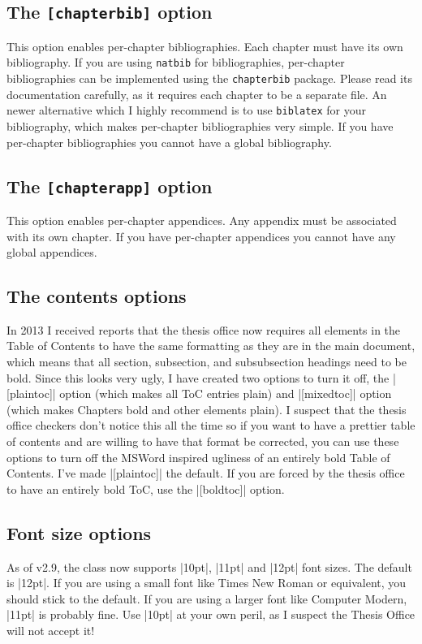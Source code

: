 \documentclass[11pt]{article}
\newcommand*{\pkg}[1]{\texttt{#1}\xspace}
\begin{document}
\subsection{The \pkg{[chapterbib]} option}
This option enables per-chapter bibliographies. Each chapter must have its own bibliography. If you are using \pkg{natbib} for bibliographies, per-chapter bibliographies can be implemented using the \pkg{chapterbib} package. Please read its documentation carefully, as it requires each chapter to be a separate file. An newer alternative which I highly recommend is to use \pkg{biblatex} for your bibliography, which makes per-chapter bibliographies very simple. If you have per-chapter bibliographies you cannot have a global bibliography.
\subsection{The \pkg{[chapterapp]} option}
This option enables per-chapter appendices. Any appendix must be associated with its own chapter. If you have per-chapter appendices you cannot have any global appendices. 
\subsection{The contents options}
In 2013 I received reports that the thesis office now requires all elements in the Table of Contents to have the same formatting as they are in the main document, which means that all section, subsection, and subsubsection headings need to be bold.  Since this looks very ugly, I have created two options to turn it off, the |[plaintoc]| option (which makes all ToC entries plain) and |[mixedtoc]| option (which makes Chapters bold and other elements plain). I suspect that the thesis office checkers don't notice this all the time so if you want to have a prettier table of contents and are willing to have that format be corrected, you can use these options to turn off the MSWord inspired ugliness of an entirely bold Table of Contents. I've made |[plaintoc]| the default.  If you are forced by the thesis office to have an entirely bold ToC, use the |[boldtoc]| option.
\subsection{Font size options}\label{fontsize}
As of v2.9, the class now supports |10pt|, |11pt| and |12pt| font sizes. The default is |12pt|. If you are using a small font like Times New Roman or equivalent, you should stick to the default. If you are using a larger font like Computer Modern, |11pt| is probably fine. Use |10pt| at your own peril, as I suspect the Thesis Office will not accept it!
\end{document}

